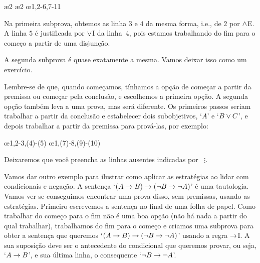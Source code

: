 \begin{fitchproof}
	\open
	\ae{2}
	\ae{2}
	\close
	\open
	\ellipsesline
	\close
	\oe{1,2-6,7-11}
\end{fitchproof}
Na primeira subprova, obtemos as linha $3$ e $4$ da mesma forma, i.e.,  de $2$ por  $\wedge$E. A linha $5$  \'e justificada por $\vee$I da linha~$4$, pois estamos trabalhando do fim para o come\c co a partir de uma disjun\c c\~ao.

A segunda subprova \'e quase exatamente a mesma. Vamos deixar isso como um exerc\'icio.

Lembre-se de que, quando come\c camos, t\'inhamos a op\c c\~ao de come\c car a partir da premissa ou come\c car pela conclus\~ao, e escolhemos a primeira op\c c\~ao. A segunda op\c c\~ao tamb\'em leva a uma prova, mas ser\'a diferente. Os primeiros passos seriam trabalhar a partir da conclus\~ao e estabelecer dois subobjetivos, `$A$' e `$B \vee C$', e depois trabalhar a partir da premissa para prov\'a-las, por exemplo:
 

\begin{fitchproof}
	\open
	\ellipsesline
	\close
	\open
	\ellipsesline
	\close
	\oe{1,2-3,(4)-(5)}
	\open
	\ellipsesline
	\close
	\open
	\ellipsesline
	\close
	\oe{1,(7)-8,(9)-(10)}	
\end{fitchproof}
Deixaremos que voc\^e preencha as linhas ausentes indicadas por ~$\vdots$.

Vamos dar outro exemplo para ilustrar como aplicar as estrat\'egias ao lidar com condicionais e nega\c c\~ao. A senten\c ca `$(A \rightarrow B) \rightarrow (\neg B \rightarrow \neg A)$' \'e uma tautologia. 
Vamos ver se conseguimos encontrar uma prova disso, sem premissas, usando as estrat\'egias. Primeiro escrevemos a senten\c ca no final de uma folha de papel. Como trabalhar do come\c co para o fim n\~ao \'e uma boa op\c c\~ao (n\~ao h\'a nada a partir do qual trabalhar), trabalhamos do fim para o come\c co e criamos uma subprova para obter a  senten\c ca que queremos `$(A \rightarrow B) \rightarrow (\neg B \rightarrow \neg A)$' usando a regra  $\rightarrow$I. A sua suposi\c c\~ao deve ser o antecedente do condicional que queremos provar, ou seja, `$A \rightarrow B$', e sua \'ultima linha, o consequente `$\neg B \rightarrow \neg A$'.
 

